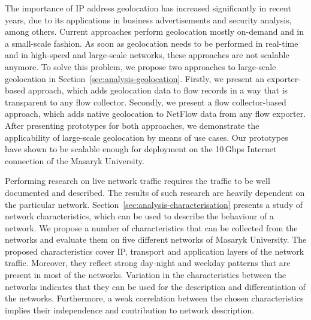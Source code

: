 The importance of IP address geolocation has increased significantly in recent years, due to its applications in business advertisements and security analysis, among others. Current approaches perform geolocation mostly on-demand and in a small-scale fashion. As soon as geolocation needs to be performed in real-time and in high-speed and large-scale networks, these approaches are not scalable anymore. To solve this problem, we propose two approaches to large-scale geolocation in Section~\ref{sec:analysis-geolocation}. Firstly, we present an exporter-based approach, which adds geolocation data to flow records in a way that is transparent to any flow collector. Secondly, we present a flow collector-based approach, which adds native geolocation to NetFlow data from any flow exporter. After presenting prototypes for both approaches, we demonstrate the applicability of large-scale geolocation by means of use cases. Our prototypes have shown to be scalable enough for deployment on the 10\,Gbps Internet connection of the Masaryk University.

Performing research on live network traffic requires the traffic to be well documented and described. The results of such research are heavily dependent on the particular network. Section~\ref{sec:analysis-characterisation} presents a study of network characteristics, which can be used to describe the behaviour of a network. We propose a number of characteristics that can be collected from the networks and evaluate them on five different networks of Masaryk University. The proposed characteristics cover IP, transport and application layers of the network traffic. Moreover, they reflect strong day-night and weekday patterns that are present in most of the networks. Variation in the characteristics between the networks indicates that they can be used for the description and differentiation of the networks. Furthermore, a weak correlation between the chosen characteristics implies their independence and contribution to network description.
